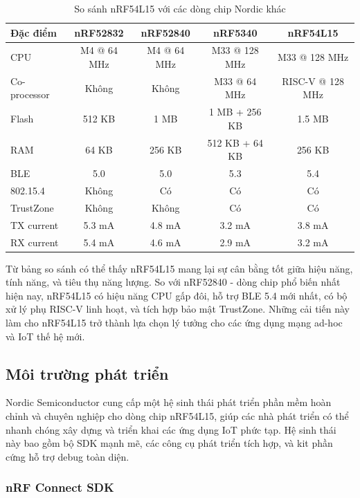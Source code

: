 \begin{table}[h!]
\centering
\caption{So sánh nRF54L15 với các dòng chip Nordic khác}
\label{tab:nrf_comparison}
\begin{tabular}{|l|c|c|c|c|}
\hline
\textbf{Đặc điểm} & \textbf{nRF52832} & \textbf{nRF52840} & \textbf{nRF5340} & \textbf{nRF54L15} \\
\hline
CPU & M4 @ 64 MHz & M4 @ 64 MHz & M33 @ 128 MHz & M33 @ 128 MHz \\
\hline
Co-processor & Không & Không & M33 @ 64 MHz & RISC-V @ 128 MHz \\
\hline
Flash & 512 KB & 1 MB & 1 MB + 256 KB & 1.5 MB \\
\hline
RAM & 64 KB & 256 KB & 512 KB + 64 KB & 256 KB \\
\hline
BLE & 5.0 & 5.0 & 5.3 & 5.4 \\
\hline
802.15.4 & Không & Có & Có & Có \\
\hline
TrustZone & Không & Không & Có & Có \\
\hline
TX current & 5.3 mA & 4.8 mA & 3.2 mA & 3.8 mA \\
\hline
RX current & 5.4 mA & 4.6 mA & 2.9 mA & 3.2 mA \\
\hline
\end{tabular}
\end{table}

Từ bảng so sánh có thể thấy nRF54L15 mang lại sự cân bằng tốt giữa hiệu năng, tính năng, và tiêu thụ năng lượng. So với nRF52840 - dòng chip phổ biến nhất hiện nay, nRF54L15 có hiệu năng CPU gấp đôi, hỗ trợ BLE 5.4 mới nhất, có bộ xử lý phụ RISC-V linh hoạt, và tích hợp bảo mật TrustZone. Những cải tiến này làm cho nRF54L15 trở thành lựa chọn lý tưởng cho các ứng dụng mạng ad-hoc và IoT thế hệ mới.

\subsection{Môi trường phát triển}

Nordic Semiconductor cung cấp một hệ sinh thái phát triển phần mềm hoàn chỉnh và chuyên nghiệp cho dòng chip nRF54L15, giúp các nhà phát triển có thể nhanh chóng xây dựng và triển khai các ứng dụng IoT phức tạp. Hệ sinh thái này bao gồm bộ SDK mạnh mẽ, các công cụ phát triển tích hợp, và kit phần cứng hỗ trợ debug toàn diện.

\subsubsection{nRF Connect SDK}

